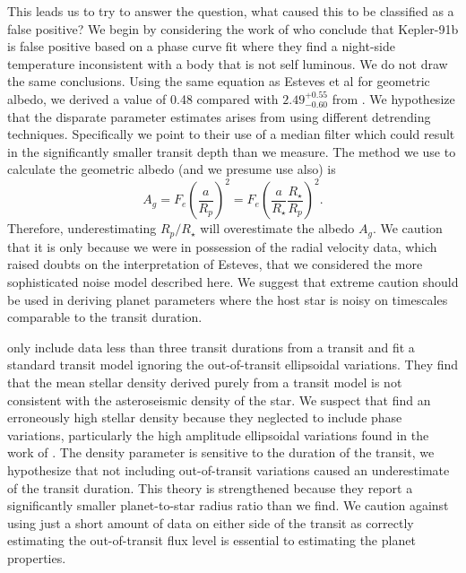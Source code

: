 \documentclass[apjl]{emulateapj}
\begin{document}
This leads us to try to answer the question, what caused this to be classified as a false positive? We begin by considering the work of \citet{esteves13} who conclude that Kepler-91b is false positive based on a phase curve fit where they find a night-side temperature inconsistent with a body that is not self luminous. We do not draw the same conclusions. Using the same equation as Esteves et al for geometric albedo, we derived a value of 0.48 compared with $2.49^{+0.55}_{-0.60}$ from \citeauthor{esteves13}. We hypothesize that the disparate parameter estimates arises from using different detrending techniques. Specifically we point to their use of a median filter which could result in the significantly smaller transit depth than we measure. The method we use to calculate the geometric albedo (and we presume \citeauthor{esteves13} use also) is
\begin{equation}
A_g = F_e \left(\frac{a}{R_p}\right)^{2} = F_e \left(\frac{a}{R_{\star}}\frac{R_{\star}}{R_{p}}\right)^{2} .
\end{equation}
Therefore, underestimating $R_{p}/R_{\star}$ will overestimate the albedo $A_g$. We caution that it is only because we were in possession of the radial velocity data, which raised doubts on the interpretation of Esteves, that we considered the more sophisticated noise model described here. We suggest that extreme caution should be used in deriving planet parameters where the host star is noisy on timescales comparable to the transit duration.

\citet{sliski14} only include data less than three transit durations from a transit and fit a standard transit model ignoring the out-of-transit ellipsoidal variations. They find that the mean stellar density derived purely from a transit model is not consistent with the asteroseismic density of the star. We suspect that \citeauthor{sliski14} find an erroneously high stellar density because they neglected to include phase variations, particularly the high amplitude ellipsoidal variations found in the work of \citet{lillo13}. The density parameter is sensitive to the duration of the transit, we hypothesize that not including out-of-transit variations caused an underestimate of the transit duration. This theory is strengthened because they report a significantly smaller planet-to-star radius ratio than we find. We caution against using just a short amount of data on either side of the transit as correctly estimating the out-of-transit flux level is essential to estimating the planet properties.
\end{document}
